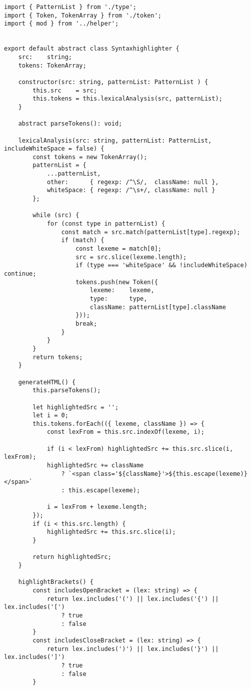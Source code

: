\documentclass[autodetect-engine,dvi=dvipdfmx,ja=standard,
               a4j,11pt]{bxjsarticle}
\begin{document}
\begin{lstlisting}[caption={ハイライタ基底クラス({\tt base.ts})}, label={prog:base}]
import { PatternList } from './type';
import { Token, TokenArray } from './token';
import { mod } from '../helper';


export default abstract class Syntaxhighlighter {
    src:    string;
    tokens: TokenArray;

    constructor(src: string, patternList: PatternList ) {
        this.src    = src;
        this.tokens = this.lexicalAnalysis(src, patternList);
    }

    abstract parseTokens(): void;

    lexicalAnalysis(src: string, patternList: PatternList, includeWhiteSpace = false) {
        const tokens = new TokenArray();
        patternList = {
            ...patternList,
            other:      { regexp: /^\S/,  className: null },
            whiteSpace: { regexp: /^\s+/, className: null }
        };

        while (src) {
            for (const type in patternList) {
                const match = src.match(patternList[type].regexp);
                if (match) {
                    const lexeme = match[0];
                    src = src.slice(lexeme.length);
                    if (type === 'whiteSpace' && !includeWhiteSpace) continue;
                    tokens.push(new Token({
                        lexeme:    lexeme,
                        type:      type,
                        className: patternList[type].className
                    }));
                    break;
                }
            }
        }
        return tokens;
    }

    generateHTML() {
        this.parseTokens();

        let highlightedSrc = '';
        let i = 0;
        this.tokens.forEach(({ lexeme, className }) => {
            const lexFrom = this.src.indexOf(lexeme, i);

            if (i < lexFrom) highlightedSrc += this.src.slice(i, lexFrom);
            highlightedSrc += className
                ? `<span class='${className}'>${this.escape(lexeme)}</span>`
                : this.escape(lexeme);
                
            i = lexFrom + lexeme.length;
        });
        if (i < this.src.length) {
            highlightedSrc += this.src.slice(i);
        }

        return highlightedSrc;
    }

    highlightBrackets() {
        const includesOpenBracket = (lex: string) => {
            return lex.includes('(') || lex.includes('{') || lex.includes('[')
                ? true
                : false
        }
        const includesCloseBracket = (lex: string) => {
            return lex.includes(')') || lex.includes('}') || lex.includes(']')
                ? true
                : false
        }


\end{lstlisting}
\end{document}
